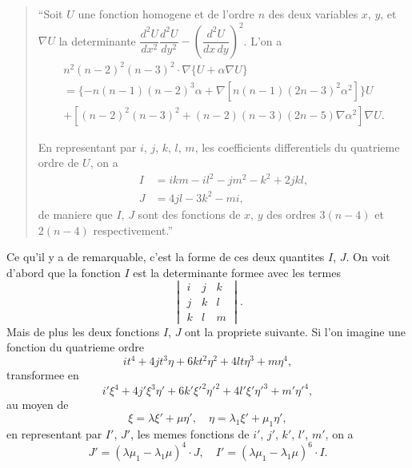 \documentclass[12pt,a4paper]{article}
\begin{document}
\begin{quote}
``Soit $U$ une fonction homogene et de l'ordre $n$ des deux variables $x$, $y$, et $\nabla U$
la determinante $\dfrac{d^2U}{dx^2} \dfrac{d^2U}{dy^2} - \left(\dfrac{d^2U}{dx\,dy}\right)^2$. L'on a
\begin{multline*}
n^2(n-2)^2(n-3)^2 \cdot \nabla\{U + \alpha \nabla U\} \\
= \{-n(n-1)(n-2)^3 \alpha + \nabla [n(n-1)(2n-3)^2 \alpha^2]\} U \\
+ [(n-2)^2(n-3)^2 + (n-2)(n-3)(2n-5)\nabla \alpha^2] \nabla U.
\end{multline*}

En representant par $i$, $j$, $k$, $l$, $m$, les coefficients differentiels du quatrieme ordre
de $U$, on a
\begin{align*}
I &= ikm - il^2 - jm^2 - k^2 + 2jkl,\\
J &= 4jl - 3k^2 - mi,
\end{align*}
de maniere que $I$, $J$ sont des fonctions de $x$, $y$ des ordres $3(n-4)$ et $2(n-4)$
respectivement.''
\end{quote}

Ce qu'il y a de remarquable, c'est la forme de ces deux quantites $I$, $J$. On voit
d'abord que la fonction $I$ est la determinante formee avec les termes
\[
\begin{vmatrix}
i & j & k\\
j & k & l\\
k & l & m
\end{vmatrix}.
\]
Mais de plus les deux fonctions $I$, $J$ ont la propriete suivante. Si l'on imagine une
fonction du quatrieme ordre
\[
it^4 + 4jt^3\eta + 6kt^2\eta^2 + 4lt\eta^3 + m\eta^4,
\]
transformee en
\[
i'\xi^4 + 4j'\xi^3\eta' + 6k'\xi'^2\eta'^2 + 4l'\xi'\eta'^3 + m'\eta'^4,
\]
au moyen de
\[
\xi = \lambda \xi' + \mu \eta',\quad \eta = \lambda_1 \xi' + \mu_1 \eta',
\]
en representant par $I'$, $J'$, les memes fonctions de $i'$, $j'$, $k'$, $l'$, $m'$, on a
\[
J' = (\lambda\mu_1 - \lambda_1\mu)^4 \cdot J,\quad I' = (\lambda\mu_1 - \lambda_1\mu)^6 \cdot I.
\]

\newpage
\setcounter{page}{116}
\end{document}
